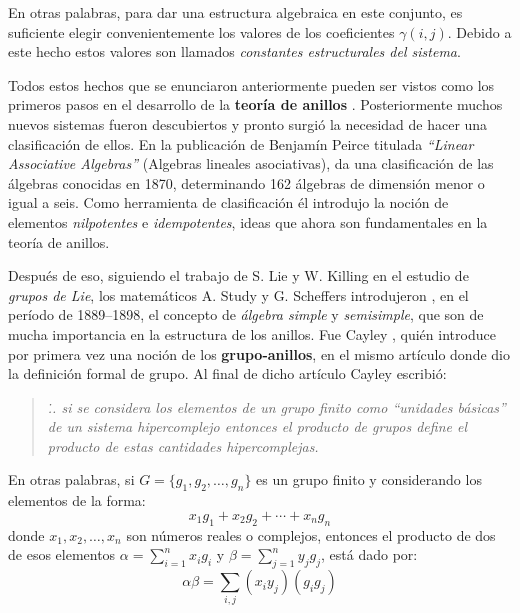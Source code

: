 \documentclass[12pt,letterpaper,titlepage]{article}
\begin{document}
En otras palabras, para dar una estructura algebraica en este conjunto, es suficiente elegir convenientemente los valores de los coeficientes $\gamma (i,j)$. Debido a este hecho estos valores son llamados \textit{constantes estructurales del sistema}.\bigskip

Todos estos hechos que se enunciaron anteriormente pueden ser vistos como los primeros pasos en el desarrollo de la \textbf{teoría de anillos} \cite[página 127]{b1}. Posteriormente muchos nuevos sistemas fueron descubiertos y pronto surgió la necesidad de hacer una clasificación de ellos. En la publicación de Benjamín Peirce titulada \textit{``Linear Associative Algebras''} (Algebras lineales asociativas), da una clasificación de las álgebras conocidas en 1870, determinando 162 álgebras de dimensión menor o igual a seis. Como herramienta de clasificación él introdujo la noción de elementos \textit{nilpotentes} e \textit{idempotentes}, ideas que ahora son fundamentales en la teoría de anillos.\bigskip

Después de eso, siguiendo el trabajo de S. Lie y W. Killing en el estudio de \textit{grupos de Lie}, los matemáticos A. Study y G. Scheffers introdujeron \cite[página 127]{b1}, en el período de 1889--1898, el concepto de \textit{álgebra simple} y \textit{semisimple}, que son de mucha importancia en la estructura de los anillos. Fue Cayley \cite[página 128]{b1}, quién introduce por primera vez una noción de los \textbf{grupo-anillos}, en el mismo artículo donde dio la definición formal de grupo. Al final de dicho artículo Cayley escribió:
\begin{quote}{\itshape
\... si se considera los elementos de un grupo finito como ``unidades básicas'' de un sistema hipercomplejo entonces el producto de grupos define el producto de estas cantidades hipercomplejas.}
\end{quote}

En otras palabras, si $G=\{g_1,g_2,\dots,g_n\}$ es un grupo finito y considerando los elementos de la forma: 
\begin{equation*}
x_1g_1+x_2g_2+\cdots + x_ng_n
\end{equation*} donde $x_1,x_2,\dots,x_n$ son números reales o complejos, entonces el producto de dos de esos elementos $\alpha = \sum\limits_{i=1}^{n}x_ig_i$ y $\beta = \sum\limits_{j=1}^{n}y_jg_j$, está dado por: 
\begin{equation*}
\alpha\beta = \sum\limits_{i,j}(x_iy_j)(g_ig_j)
\end{equation*}
\end{document}
